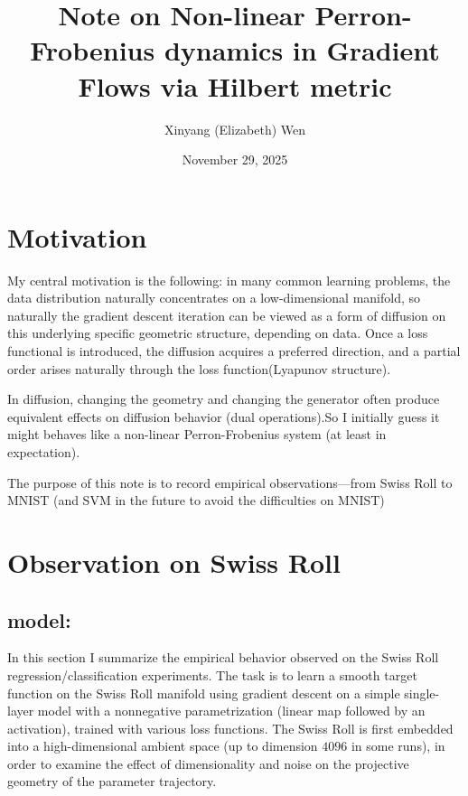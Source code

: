 \documentclass[11pt]{article}
\title{\textbf{Note on Non-linear Perron-Frobenius dynamics in Gradient Flows via Hilbert metric}}
\author{Xinyang (Elizabeth) Wen}
\date{November 29, 2025}
\begin{document}
\maketitle


\section{Motivation}

My central motivation is the following:
in many common learning problems, the data distribution naturally
concentrates on a low-dimensional manifold,
so naturally the gradient descent iteration can be viewed as a form of
diffusion on this underlying specific geometric structure, depending on data. Once a loss
functional is introduced, the diffusion acquires a preferred direction,
and a partial order arises naturally through the loss function(Lyapunov structure).

In diffusion, changing the geometry and changing the generator often produce equivalent effects on diffusion behavior (dual operations).So I initially guess it might
behaves like a non-linear Perron-Frobenius
system (at least in expectation).

The purpose of this note is to record empirical observations—from Swiss Roll to MNIST
(and SVM in the future to avoid the difficulties on MNIST)

\section{Observation on Swiss Roll}
\subsection{model:}
In this section I summarize the empirical behavior observed on the
Swiss Roll regression/classification experiments.  The task is to learn
a smooth target function on the Swiss Roll manifold using gradient
descent on a simple single-layer model with a nonnegative
parametrization (linear map followed by an activation), trained with
various loss functions.  The Swiss Roll is first embedded into a
high-dimensional ambient space (up to dimension $4096$ in some runs), in
order to examine the effect of dimensionality and noise on the projective 
geometry of the parameter trajectory.
\end{document}
